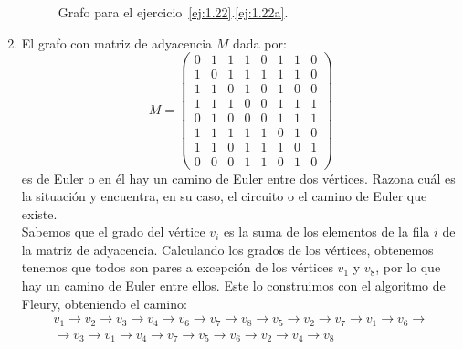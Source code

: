 \begin{ejercicio}
\begin{enumerate}
\begin{figure}
            \caption{Grafo para el ejercicio~\ref{ej:1.22}.\ref{ej:1.22a}.}
            \label{fig:1.22}
        \end{figure}

                    
        \label{ej:1.22a}
        \item\label{ej:1.22b}
        El grafo con matriz de adyacencia $M$ dada por:
        \[
            M=\begin{pmatrix}
                0 & 1 & 1 & 1 & 0 & 1 & 1 & 0 \\
                1 & 0 & 1 & 1 & 1 & 1 & 1 & 0 \\
                1 & 1 & 0 & 1 & 0 & 1 & 0 & 0 \\
                1 & 1 & 1 & 0 & 0 & 1 & 1 & 1 \\
                0 & 1 & 0 & 0 & 0 & 1 & 1 & 1 \\
                1 & 1 & 1 & 1 & 1 & 0 & 1 & 0 \\
                1 & 1 & 0 & 1 & 1 & 1 & 0 & 1 \\
                0 & 0 & 0 & 1 & 1 & 0 & 1 & 0
            \end{pmatrix}
        \]
        es de Euler o en él hay un camino de Euler entre dos vértices. Razona cuál es la situación y encuentra, en su caso, el circuito o el camino de Euler que existe.\\

        Sabemos que el grado del vértice $v_i$ es la suma de los elementos de la fila $i$ de la matriz de adyacencia. Calculando los grados de los vértices, obtenemos tenemos que todos son pares a excepción de los vértices $v_1$ y $v_8$, por lo que hay un camino de Euler entre ellos. Este lo construimos con el algoritmo de Fleury, obteniendo el camino:
        \begin{multline*}
            v_1\to v_2\to v_3\to v_4\to v_6\to v_7\to v_8\to v_5\to v_2\to v_7\to v_1\to v_6\to \\\to v_3\to v_1\to v_4\to v_7\to v_5\to v_6\to v_2\to v_4\to v_8
        \end{multline*}
    \end{enumerate}
\end{ejercicio}

